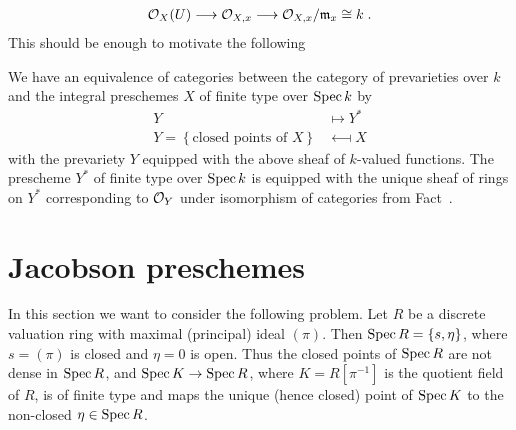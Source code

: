 \documentclass[a4paper,parskip=half,numbers=enddot, DIV=12]{scrreprt}
\begin{document}
\begin{align*}
    \Oo_X(U)\morphism \Oo_{X,x} \morphism \Oo_{X,x}/\mm_x \cong k\;.
\end{align*}
This should be enough to motivate the following
\begin{thm}
    We have an equivalence of categories between the category of prevarieties over $k$ and the integral preschemes $X$ of finite type over $\operatorname{Spec} k$ by
    \begin{align*}
        Y &\longmapsto Y^*\\
        Y = \left\{\text{closed points of } X\right\} &\longmapsfrom X
    \end{align*}
    with the prevariety $Y$ equipped with the above sheaf of $k$-valued functions. The prescheme $Y^*$ of finite type over $\operatorname{Spec} k$ is equipped with the unique sheaf of rings on $Y^*$ corresponding to $\mathcal{O}_Y$ under isomorphism of categories from Fact~.
\end{thm}
\section{Jacobson preschemes}

In this section we want to consider the following problem. Let $R$ be a discrete valuation ring with maximal (principal) ideal $(\pi)$. Then $\operatorname{Spec} R = \{s,\eta\}$, where $s= (\pi)$ is closed and $\eta = 0$ is open. Thus the closed points of $\operatorname{Spec} R$ are not dense in $\operatorname{Spec} R$, and $\Spec K \morphism \Spec R$, where $K= R[\pi^{-1}]$ is the quotient field of $R$, is of finite type and maps the unique (hence closed) point of $\operatorname{Spec} K$ to the non-closed $\eta\in \operatorname{Spec} R$.
\end{document}
